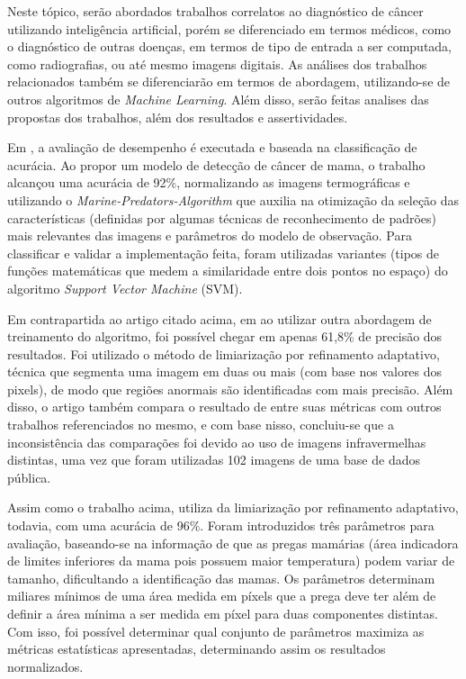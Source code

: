 Neste tópico, serão abordados trabalhos correlatos ao diagnóstico de câncer utilizando inteligência artificial, porém se diferenciado em termos médicos, como o diagnóstico de outras doenças, em termos de tipo de entrada a ser computada, como radiografias, ou até mesmo imagens digitais. As análises dos trabalhos relacionados também se diferenciarão em termos de abordagem, utilizando-se de outros algoritmos de \textit{Machine Learning}. Além disso, serão feitas analises das propostas dos trabalhos, além dos resultados e assertividades.

Em , a avaliação de desempenho é executada e baseada na classificação de acurácia. Ao propor um modelo de detecção de câncer de mama, o trabalho alcançou uma acurácia de 92\%, normalizando as imagens termográficas e utilizando o \textit{Marine-Predators-Algorithm} que auxilia na otimização da seleção das características (definidas por algumas técnicas de reconhecimento de padrões) mais relevantes das imagens e parâmetros do modelo de observação. Para classificar e validar a implementação feita, foram utilizadas variantes (tipos de funções matemáticas que medem a similaridade entre dois pontos no espaço) do algoritmo \textit{Support Vector Machine} (SVM).

Em contrapartida ao artigo citado acima, em  ao utilizar outra abordagem de treinamento do algoritmo, foi possível chegar em apenas 61,8\% de precisão dos resultados. Foi utilizado o método de limiarização por refinamento adaptativo, técnica que segmenta uma imagem em duas ou mais (com base nos valores dos pixels), de modo que regiões anormais são identificadas com mais precisão. Além disso, o artigo também compara o resultado de entre suas métricas com outros trabalhos referenciados no mesmo, e com base nisso, concluiu-se que a inconsistência das comparações foi devido ao uso de imagens infravermelhas distintas, uma vez que foram utilizadas 102 imagens de uma base de dados pública.

Assim como o trabalho acima,  utiliza da limiarização por refinamento adaptativo, todavia, com uma acurácia de 96\%. Foram introduzidos três parâmetros para avaliação, baseando-se na informação de que as pregas mamárias (área indicadora de limites inferiores da mama pois possuem maior temperatura) podem variar de tamanho, dificultando a identificação das mamas. Os parâmetros determinam miliares mínimos de uma área medida em píxels que a prega deve ter além de definir a área mínima a ser medida em píxel para duas componentes distintas. Com isso, foi possível determinar qual conjunto de parâmetros maximiza as métricas estatísticas apresentadas, determinando assim os resultados normalizados.

